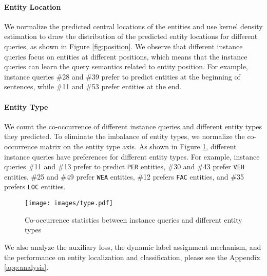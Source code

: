 \documentclass[11pt]{article}
\begin{document}
\paragraph{Entity Location} We normalize the predicted central locations of the entities and use kernel density estimation to draw the distribution of the predicted entity locations for different queries, as shown in Figure \ref{fig:position}. We observe that different instance queries focus on entities at different positions, which means that the instance queries can learn the query semantics related to entity position.
For example, instance queries \#28 and \#39 prefer to predict entities at the beginning of sentences, while \#11 and \#53 prefer entities at the end. 



\paragraph{Entity Type} We count the co-occurrence of different instance queries and different entity types they predicted. To eliminate the imbalance of entity types, we normalize the co-occurrence matrix on the entity type axis. As shown in Figure \ref{fig:type},  different instance queries have preferences for different entity types. For example, instance queries \#11 and \#13 prefer to predict \texttt{PER} entities, \#30 and \#43 prefer \texttt{VEH} entities, \#25 and \#49 prefer \texttt{WEA} entities, \#12 prefers \texttt{FAC} entities, and \#35 prefers \texttt{LOC} entities.







\begin{figure}[h]
  \centering
  \texttt{[image: images/type.pdf]}
  \caption{Co-occurrence statistics between instance queries and different entity types}
  \label{fig:type}
\end{figure}




We also analyze the auxiliary loss, the dynamic label assignment mechanism, and the performance on entity localization and classification, please see the Appendix \ref{app:analysis}.
\end{document}
